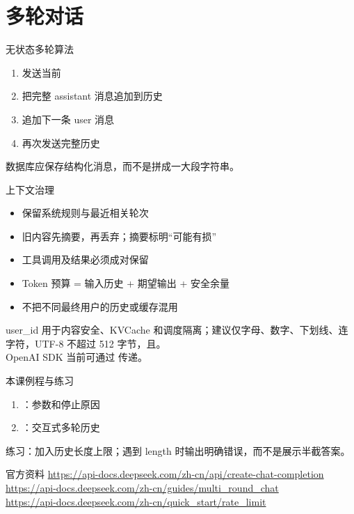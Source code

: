 \documentclass[aspectratio=169,UTF8]{ctexbeamer}
\begin{document}
\section{多轮对话}
\begin{frame}{无状态多轮算法}
\begin{enumerate}
  \item 发送当前 
  \item 把完整 assistant 消息追加到历史
  \item 追加下一条 user 消息
  \item 再次发送完整历史
\end{enumerate}
数据库应保存结构化消息，而不是拼成一大段字符串。
\end{frame}
\begin{frame}{上下文治理}
\begin{itemize}
  \item 保留系统规则与最近相关轮次
  \item 旧内容先摘要，再丢弃；摘要标明“可能有损”
  \item 工具调用及结果必须成对保留
  \item Token 预算 = 输入历史 + 期望输出 + 安全余量
  \item 不把不同最终用户的历史或缓存混用
\end{itemize}
\end{frame}
\begin{frame}{user\_id}
 用于内容安全、KVCache 和调度隔离；建议仅字母、数字、下划线、连字符，UTF-8 不超过 512 字节，且。\\[8pt]
OpenAI SDK 当前可通过  传递。
\end{frame}
\begin{frame}{本课例程与练习}
\begin{enumerate}
  \item {}：参数和停止原因
  \item {}：交互式多轮历史
\end{enumerate}
练习：加入历史长度上限；遇到 length 时输出明确错误，而不是展示半截答案。
\end{frame}
\begin{frame}{官方资料}
\small
\url{https://api-docs.deepseek.com/zh-cn/api/create-chat-completion}\\
\url{https://api-docs.deepseek.com/zh-cn/guides/multi_round_chat}\\
\url{https://api-docs.deepseek.com/zh-cn/quick_start/rate_limit}
\end{frame}
\end{document}
